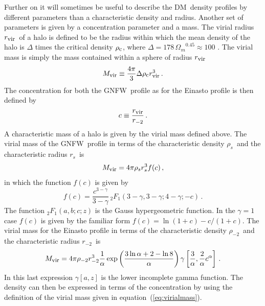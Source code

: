 \documentclass[aps,prd,twocolumn,amsmath,amssymb,floatfix,nofootinbib,10pt]{revtex4}
\newcommand{\NFW}{NFW}
\newcommand{\GNFW}{G\NFW}
\newcommand{\DM}{DM}
\newcommand{\eqnname}{equation}
\newcommand{\rhos}{\ensuremath{\rho_s}}
\newcommand{\rs}{\ensuremath{r_s}}
\newcommand{\rhominustwo}{\ensuremath{\rho_{-2}}}
\newcommand{\rminustwo}{\ensuremath{r_{-2}}}
\newcommand{\alphaEinasto}{\ensuremath{\alpha}}
\newcommand{\Mvir}{\ensuremath{M_{\mbox{{\footnotesize vir}}}}}
\newcommand{\Rvir}{\ensuremath{r_{\mbox{{\footnotesize vir}}}}}
\newcommand{\conc}{\ensuremath{c}}
\newcommand{\rhoc}{\ensuremath{\rho_{\mbox{{\footnotesize c}}}}}
\newcommand{\omegam}{\ensuremath{\Omega_{m}}}
\begin{document}
Further on it will sometimes be useful to describe the \DM\ density
profiles by different parameters than a characteristic density and
radius. Another set of parameters is given by a concentration
parameter and a mass. The virial radius \Rvir\ of a halo is defined to
be the radius within which the mean density of the halo is $\Delta$
times the critical density $\rhoc$, where $\Delta = 178\,
\omegam^{0.45} \approx 100$
\cite{1996MNRAS.282..263E,1998ApJ...495...80B}. The virial mass is
simply the mass contained within a sphere of radius \Rvir
\begin{equation}\label{eq:virialmass}
\Mvir \equiv \frac{4\pi}{3} \Delta \rhoc \Rvir^3\, .
\end{equation}
The concentration for both the \GNFW\ profile as for the Einasto
profile is then defined by
\begin{equation}\label{eq:concdef}
\conc \equiv \frac{\Rvir}{\rminustwo}\, .
\end{equation}
A characteristic mass of a halo is given by the virial mass defined
above. The virial mass of the \GNFW\ profile in terms of the
characteristic density \rhos\ and the characteristic radius \rs\ is
\begin{equation}\label{eq:Mvirdef}
\Mvir = 4\pi\rhos\rs^3 f(c)\, ,
\end{equation}
in which the function $f(c)$ is given by
\begin{equation}\label{eq:hypergeometric}
f(c) = \frac{c^{3-\gamma}}{3-\gamma} \, {_2F_1}\left(3-\gamma,3-\gamma;4-\gamma;-c\right)\, .
\end{equation}
The function $_2 F_1\left(a,b;c;z\right)$ is the Gauss hypergeometric
function. In the $\gamma = 1$ case $f(c)$ is given by the familiar
form $f(c) = \ln(1+c)-c/(1+c)$. The virial mass for the Einasto
profile in terms of the characteristic density \rhominustwo\ and the
characteristic radius \rminustwo\ is
\begin{equation}
\Mvir = 4\pi\rhominustwo\rminustwo^3 \frac{1}{\alphaEinasto} \exp\left(\frac{3\ln \alphaEinasto + 2 - \ln 8}{\alphaEinasto}\right) \gamma\left[\frac{3}{\alphaEinasto},\frac{2}{\alphaEinasto}\conc^\alphaEinasto\right]\, .
\end{equation}
In this last expression $\gamma\left[a,z\right]$ is the lower
incomplete gamma function. The density can then be expressed in terms
of the concentration by using the definition of the virial mass given
in \eqnname~(\ref{eq:virialmass}).
\end{document}
